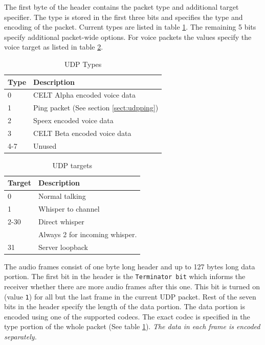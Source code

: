\documentclass[11pt]{article} %
\begin{document}
The first byte of the header contains the packet type and additional target specifier. The type is stored in the first three bits and specifies the type and encoding of the packet. Current types are listed in table \ref{tbl:udptypes}. The remaining 5 bits specify additional packet-wide options. For voice packets the values specify the voice target as listed in table \ref{tbl:udptargets}.

\begin{table}[htp]\begin{center}
	\caption{UDP Types}\label{tbl:udptypes}

	\begin{tabular}{ll}
		Type & Description \\
		\hline
		0	& CELT Alpha encoded voice data \\
		1	& Ping packet (See section \ref{sect:udpping}) \\
		2	& Speex encoded voice data \\
		3	& CELT Beta encoded voice data \\
		4-7 & Unused
	\end{tabular}
\end{center}\end{table}

\begin{table}[htp]\begin{center}
	\caption{UDP targets}\label{tbl:udptargets}

	\begin{tabular}{ll}
		Target & Description \\
		\hline
		0	& Normal talking \\
		1	& Whisper to channel \\
		2-30	& Direct whisper \\
			& Always 2 for incoming whisper. \\
		31	& Server loopback
	\end{tabular}
\end{center}\end{table}

The audio frames consist of one byte long header and up to 127 bytes long data portion. The first bit in the header is the \texttt{Terminator bit} which informs the receiver whether there are more audio frames after this one. This bit is turned on (value \texttt{1}) for all but the last frame in the current UDP packet. Rest of the seven bits in the header specify the length of the data portion. The data portion is encoded using one of the supported codecs. The exact codec is specified in the type portion of the whole packet (See table \ref{tbl:udptypes}). \emph{The data in each frame is encoded separately.}
\end{document}
